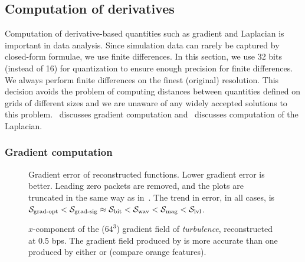 \subsection{Computation of derivatives} \label{sec:derivatives}

Computation of derivative-based quantities such as gradient and Laplacian is important in data analysis.
Since simulation data can rarely be captured by closed-form formulae, we use finite differences. In
this section, we use 32 bits (instead of 16) for quantization to ensure enough precision for finite
differences. We always perform finite differences on the finest (original) resolution. This decision
avoids the problem of computing distances between quantities defined on grids of different sizes and
we are unaware of any widely accepted solutions to this problem.~
discusses gradient computation and~ discusses computation of the Laplacian.

\subsubsection{Gradient computation} \label{sec:gradient}

\begin{figure*}[t]
\centering
{}
\caption{Gradient error of reconstructed functions. Lower gradient error is better. Leading zero
packets are removed, and the plots are truncated in the same way as in~.
The trend in error, in all cases, is $\sgop < \sgsg \approx \sbit < \swav < \smag < \slvl$.}
\label{fig:gradient-error-comparison}
\vspace{1em}

\centering
{}
\caption{$x$-component of the ($64^3$) gradient field of \emph{turbulence}, reconstructed at 0.5
bps. The gradient field produced by \sbit is more accurate than one produced by either \swav or
\sgsg (compare orange features).}
\label{fig:gradient-rendering-diff}
\end{figure*}

